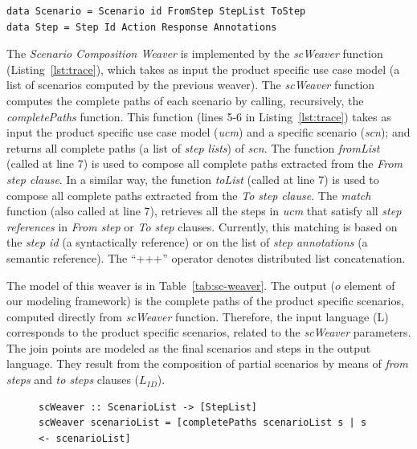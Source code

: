 \documentclass{acm_proc_article-sp}
\begin{document}
{\begin{lstlisting}[belowskip=10pt,frame=tb,caption={Abstract syntax of scenario artifact},label=lst:ucm]
data Scenario = Scenario id FromStep StepList ToStep
data Step = Step Id Action Response Annotations
\end{lstlisting}

The \emph{Scenario Composition Weaver} is implemented by the \emph{scWeaver} function (Listing~\ref{lst:trace}), which takes 
as input the product specific use case model (a list of scenarios computed by the previous weaver).  
The \emph{scWeaver} function computes the complete paths of each  
scenario by calling, recursively, the \emph{completePaths} function. This 
function (lines 5-6 in Listing~\ref{lst:trace}) 
takes as input the product specific use case model (\emph{ucm}) and a specific
scenario (\emph{scn});
and returns all complete paths (a list of \emph{step lists}) of
\emph{scn}. The function \emph{fromList} (called at line 7) is used to
compose all complete paths extracted from the \emph{From step
clause}. In a similar way, the function \emph{toList} (called at
line 7) is used to compose all complete paths extracted from the
\emph{To step clause}. The \emph{match} function (also called at
line 7), retrieves all the steps in \emph{ucm} that satisfy all 
\emph{step references} in \emph{From step} or \emph{To step}
clauses. Currently, this matching is based on the \emph{step id} (a
syntactically reference) or on the list of \emph{step annotations}
(a semantic reference). The ``+++'' operator denotes distributed
list concatenation.

The model of this weaver is in Table~\ref{tab:sc-weaver}. The output ($o$ element of our modeling framework) is the complete paths of the product specific scenarios, computed directly from \emph{scWeaver} function. Therefore, the input language (L) corresponds to the product specific scenarios, related to the \emph{scWeaver} 
 parameters. 
The join points are modeled as the final scenarios and steps in the output language. They result from the composition of partial scenarios by means of 
\emph{from steps} and \emph{to steps} clauses ($L_{ID}$).  



\begin{figure}
\begin{lstlisting}[belowskip=10pt,frame=tb,caption={Scenario composition weaver function},label=lst:trace]
scWeaver :: ScenarioList -> [StepList]
scWeaver scenarioList = [completePaths scenarioList s | s <- scenarioList]
 

\end{lstlisting}
\end{figure}}
\end{document}

